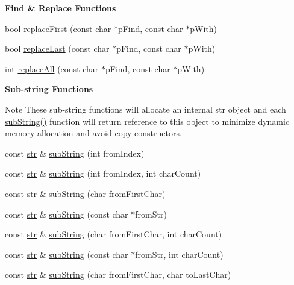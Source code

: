 \begin{Indent}{\bf Find \& Replace Functions}\par
\begin{DoxyCompactItemize}
\item 
bool \hyperlink{classstr_ad63139de03fe493fefb1982fb0b3bd79}{replace\+First} (const char $\ast$p\+Find, const char $\ast$p\+With)
\item 
bool \hyperlink{classstr_a4c0ac970e751612fa010a95d333e2d08}{replace\+Last} (const char $\ast$p\+Find, const char $\ast$p\+With)
\item 
int \hyperlink{classstr_aa8906d8f03f01e86fdcfa92f5d18acfd}{replace\+All} (const char $\ast$p\+Find, const char $\ast$p\+With)
\end{DoxyCompactItemize}
\end{Indent}
\begin{Indent}{\bf Sub-\/string Functions}\par
{\em \begin{DoxyNote}{Note}
These sub-\/string functions will allocate an internal str object and each \hyperlink{classstr_aa4c39b3a9fd1691e2cf720216783494d}{sub\+String()} function will return reference to this object to minimize dynamic memory allocation and avoid copy constructors. 
\end{DoxyNote}
}\begin{DoxyCompactItemize}
\item 
const \hyperlink{classstr}{str} \& \hyperlink{classstr_aa4c39b3a9fd1691e2cf720216783494d}{sub\+String} (int from\+Index)
\item 
const \hyperlink{classstr}{str} \& \hyperlink{classstr_a9d9c2d51c0f0a62eb1535b608caaa9bf}{sub\+String} (int from\+Index, int char\+Count)
\item 
const \hyperlink{classstr}{str} \& \hyperlink{classstr_a45d006c235e6180ce4e8f59ce28b6861}{sub\+String} (char from\+First\+Char)
\item 
const \hyperlink{classstr}{str} \& \hyperlink{classstr_a9726aac8bc8c048c0a8de0503bf3fcce}{sub\+String} (const char $\ast$from\+Str)
\item 
const \hyperlink{classstr}{str} \& \hyperlink{classstr_a7e07d7c67aab7f07579f253fe847297c}{sub\+String} (char from\+First\+Char, int char\+Count)
\item 
const \hyperlink{classstr}{str} \& \hyperlink{classstr_ae92cfd8e2871fe7f4700a63fbbca4175}{sub\+String} (const char $\ast$from\+Str, int char\+Count)
\item 
const \hyperlink{classstr}{str} \& \hyperlink{classstr_a5662c90c4102af41a5b4fc6d89dc8837}{sub\+String} (char from\+First\+Char, char to\+Last\+Char)
\end{DoxyCompactItemize}
\end{Indent}
